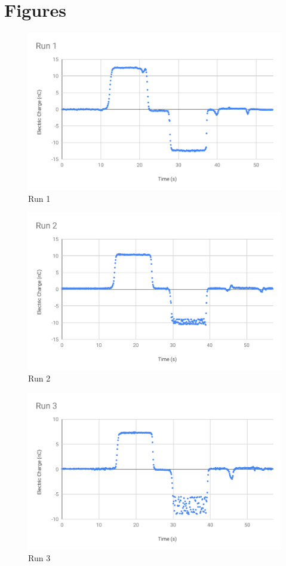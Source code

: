 \section{Figures}
%
\begin{figure}[ht]
	\centering
	\includegraphics[scale=0.74]{image/01-electro/Run1.pdf}
	\caption{Run 1}
	\label{figure.01.run.1}
\end{figure}
%
\begin{figure}[ht]
	\centering
	\includegraphics[scale=0.74]{image/01-electro/Run2.pdf}
	\caption{Run 2}
	\label{figure.01.run.2}
\end{figure}
%
\begin{figure}[ht]
	\centering
	\includegraphics[scale=0.74]{image/01-electro/Run3.pdf}
	\caption{Run 3}
	\label{figure.01.run.3}
\end{figure}
